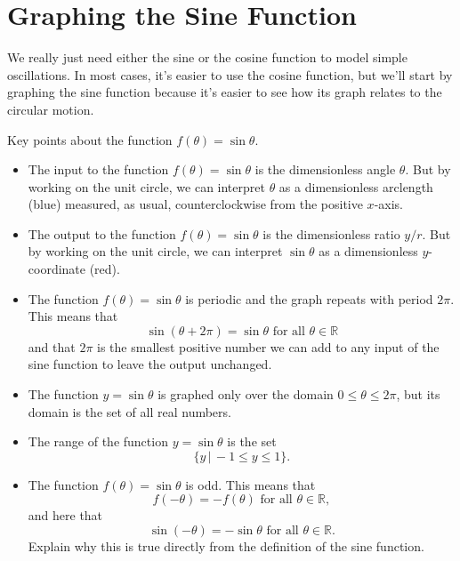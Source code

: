 \documentclass{ximera}
\begin{document}
\begin{onlineOnly}
    \begin{center}
\end{center}
\end{onlineOnly}


\section{Graphing the Sine Function}
We really just need either the sine or the cosine function to model simple oscillations. In most cases, it's easier to use the cosine function, but we'll start by graphing the sine function because it's easier to see how its graph relates to the circular motion.


\begin{exploration}  \label{Esdfsatnh4}

Key points about the function $f(\theta)=\sin\theta$.

\begin{itemize}

\item{The input to the function $f(\theta) = \sin\theta$ is the dimensionless angle $\theta$. But by working on the unit circle, we can interpret $\theta$ as a dimensionless arclength (blue) measured, as usual, counterclockwise from the positive $x$-axis.} 

\item{The output to the function $f(\theta) = \sin\theta$ is the dimensionless ratio $y/r$. But by working on the unit circle, we can interpret $\sin\theta$ as a dimensionless $y$-coordinate (red).}

\item{The function $f(\theta) = \sin\theta$ is periodic and the graph repeats with period $2\pi$. This means that 
\[
   \sin (\theta + 2\pi) = \sin \theta \text{ for all } \theta \in \mathbb{R}  
\]
and that $2\pi$ is the smallest positive number we can add to any input of the sine function to leave the output unchanged.}

\item{The function $y=\sin \theta$ is graphed only over the domain $0\leq \theta \leq 2\pi$, but its domain is the set of all real numbers.} 

\item{The range of the function $y=\sin\theta$ is the set
\[
     \{  y \, | \, -1\leq y \leq 1 \}.
\]}

\item{The function $f(\theta) = \sin\theta$ is odd. This means that 
\[
   f(-\theta) = - f(\theta) \text{ for all } \theta \in \mathbb{R} ,
\]
and here that 
\[
    \sin (-\theta) = - \sin \theta \text{ for all } \theta \in \mathbb{R} .
\]
Explain why this is true directly from the definition of the sine function.
}
\end{itemize}



\end{exploration}
\end{document}
